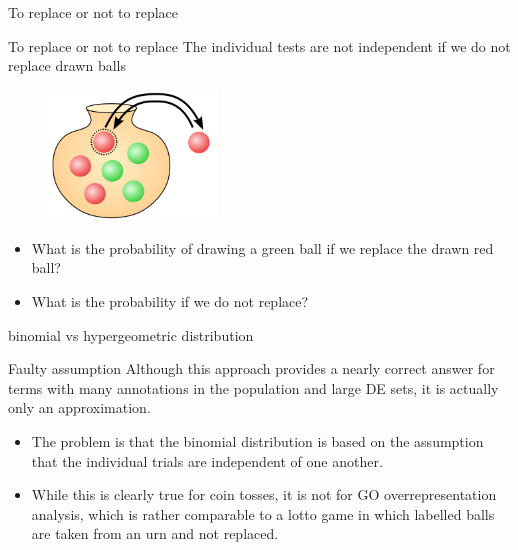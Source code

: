 \documentclass{beamer}
\begin{document}
\begin{frame}{To replace or not to replace}
\begin{mybluebox}{To replace or not to replace}
The individual tests are not independent if we do not replace drawn balls
\end{mybluebox}
\begin{figure}
\centering
\includegraphics[width=0.4\textwidth]{img/urn.png} 

\end{figure}
\begin{itemize}
\item What is the probability of drawing a green ball if we replace the drawn red ball?
\item What is the probability  if we do not replace?

\end{itemize}

\end{frame}




\begin{frame}{binomial vs hypergeometric distribution}
\begin{mybluebox}{Faulty assumption}
 Although this approach provides a nearly correct answer for terms with
many annotations in the population and large DE sets, it is actually
only an approximation. 
\end{mybluebox}
\begin{itemize}
\item The problem is that the binomial distribution
is based on the assumption that the individual trials are independent
of one another. 
\item While this is clearly true for coin tosses, it is not
for GO overrepresentation analysis, which is rather comparable to a
lotto game in which labelled balls are taken from an urn and not
replaced.
\end{itemize}


\end{frame}
\end{document}

